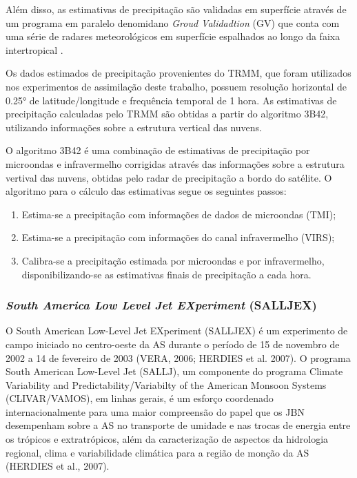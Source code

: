 Além disso, as estimativas de precipitação são validadas em superfície através de um programa em paralelo denomidano \textit{Groud Validadtion} (GV) que conta com uma série de radares meteorológicos em superfície espalhados ao longo da faixa intertropical \cite{collischonnetal07}. 

Os dados estimados de precipitação provenientes do TRMM, que foram utilizados nos experimentos de assimilação deste trabalho, possuem resolução horizontal de 0.25° de latitude/longitude e frequência temporal de 1 hora. As estimativas de precipitação calculadas pelo TRMM são obtidas a partir do algoritmo 3B42, utilizando informações sobre a estrutura vertical das nuvens.
    
O algoritmo 3B42 é uma combinação de estimativas de precipitação por microondas e infravermelho corrigidas através das informações sobre a estrutura vertival das nuvens, obtidas pelo radar de precipitação a bordo do satélite. O algoritmo para o cálculo das estimativas segue os seguintes passos:

\begin{enumerate}
\item Estima-se a precipitação com informações de dados de microondas (TMI); 
\item Estima-se a precipitação com informações do canal infravermelho (VIRS); 
\item Calibra-se a precipitação estimada por microondas e por infravermelho, disponibilizando-se as estimativas finais de precipitação a cada hora.
\end{enumerate}

\subsubsection{\textit{South America Low Level Jet EXperiment} (SALLJEX)}

O South American Low-Level Jet EXperiment (SALLJEX) é um experimento de campo iniciado no centro-oeste da AS durante o período de 15 de novembro de 2002 a 14 de fevereiro de 2003 (VERA, 2006; HERDIES et al. 2007). O programa South American Low-Level Jet (SALLJ), um componente do programa Climate Variability and Predictability/Variabilty of the American Monsoon Systems (CLIVAR/VAMOS), em linhas gerais, é um esforço coordenado internacionalmente para uma maior compreensão do papel que os JBN desempenham sobre a AS no transporte de umidade e nas trocas de energia entre os trópicos e extratrópicos, além da caracterização de aspectos da hidrologia regional, clima e variabilidade climática para a região de monção da AS (HERDIES et al., 2007). 

